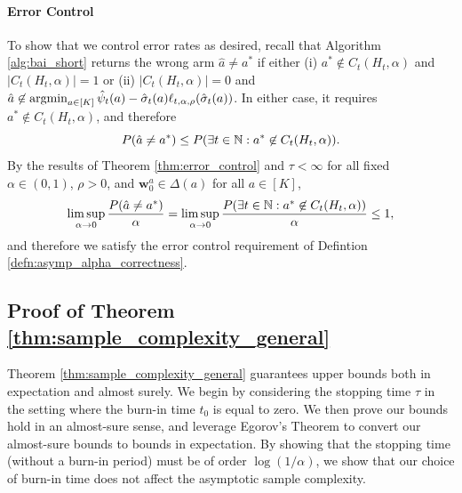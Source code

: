 \documentclass{article}
\begin{document}
\begin{appendices}
\paragraph{Error Control} 
To show that we control error rates as desired, recall that Algorithm \ref{alg:bai_short} returns the wrong arm $\hat{a} \neq a^*$ if either (i) $a^* \not\in C_t(H_t, \alpha)$ and $|C_t(H_t, \alpha)| = 1$ or (ii) $|C_t(H_t, \alpha)| =0$ and $\hat{a} \not\in \argmin_{a \in [K]}\hat\psi_t(a) - \hat\sigma_t(a) \ell_{t,\alpha,\rho}(\hat\sigma_t(a))$.  In either case, it requires $a^* \not\in C_t(H_t, \alpha)$, and therefore
\begin{equation}
    P(\hat{a} \neq a^*) \leq P(\exists t \in \mathbb{N}: a^* \not\in C_t(H_t,\alpha)). 
\end{equation}
By the results of Theorem \ref{thm:error_control} and $\tau < \infty$ for all fixed $\alpha \in (0,1)$, $\rho > 0$, and $\bm{w}_0^a \in \Delta(a)$ for all $a \in [K]$,
\begin{equation}
    \limsup_{\alpha \rightarrow 0}\frac{P(\hat{a} \neq a^*)}{\alpha} = \limsup_{\alpha \rightarrow 0}\frac{P(\exists t \in \mathbb{N}: a^* \not\in C_t(H_t,\alpha) )}{\alpha} \leq 1,
\end{equation}
and therefore we satisfy the error control requirement of Defintion \ref{defn:asymp_alpha_correctness}. 

\subsection{Proof of Theorem \ref{thm:sample_complexity_general} }

Theorem \ref{thm:sample_complexity_general} guarantees upper bounds both in expectation and almost surely. We begin by considering the stopping time $\tau$ in the setting where the burn-in time $t_0$ is equal to zero. We then prove our bounds hold in an almost-sure sense, and leverage Egorov's Theorem to convert our almost-sure bounds to bounds in expectation. By showing that the stopping time (without a burn-in period) must be of order $\log(1/\alpha)$, we show that our choice of burn-in time does not affect the asymptotic sample complexity.


\end{appendices}
\end{document}
